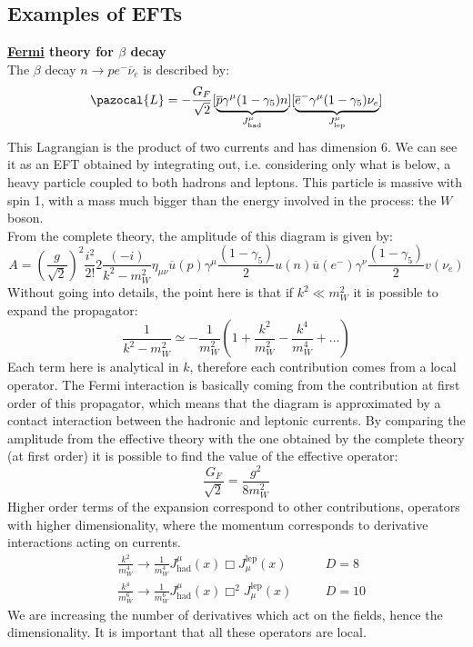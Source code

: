 \documentclass[../main.tex]{subfiles}
\begin{document}
\subsection{Examples of EFTs}
\begin{example}\textbf{\href{https://en.wikipedia.org/wiki/Enrico_Fermi}{Fermi} theory for $\beta$ decay}\\
The $\beta$ decay $n\to pe^-\overline{\nu}_e$ is described by:
\[
\pazocal{L}=-\frac{G_F}{\sqrt{2}}[\underbrace{\overline{p}\gamma^\mu(1-\gamma_5)n}_{J^{\mu}_{\text{had}}}][\underbrace{\overline{e}^-\gamma^\mu(1-\gamma_5)\nu_e}_{J^{\mu}_{\text{lep}}}]
\]
This Lagrangian is the product of two currents and has dimension 6. We can see it as an EFT obtained by integrating out, i.e. considering only what is below, a heavy particle coupled to both hadrons and leptons. This particle is massive with spin 1, with a mass much bigger than the energy involved in the process: the $W$ boson.\\
From the complete theory, the amplitude of this diagram is given by:
\[
A=\left(\frac{g}{\sqrt{2}}\right)^2\frac{i^2}{2!}2\frac{(-i)}{k^2-m_W^2}\eta_{\mu\nu}\overline{u}(p)\gamma^\mu\frac{(1-\gamma_5)}{2}u(n)\overline{u}(e^-)\gamma^\nu\frac{(1-\gamma_5)}{2}v(\nu_e)
\]
Without going into details, the point here is that if $k^2\ll m_W^2$ it is possible to expand the propagator:
\[
\frac{1}{k^2-m_W^2}\simeq-\frac{1}{m_W^2}\left(1+\frac{k^2}{m_W^2}-\frac{k^4}{m_W^4}+\dots\right)
\]
Each term here is analytical in $k$, therefore each contribution comes from a local operator. The Fermi interaction is basically coming from the contribution at first order of this propagator, which means that the diagram is approximated by a contact interaction between the hadronic and leptonic currents. By comparing the amplitude from the effective theory with the one obtained by the complete theory (at first order) it is possible to find the value of the effective operator:
\[
\frac{G_F}{\sqrt{2}}=\frac{g^2}{8m_W^2}
\]
Higher order terms of the expansion correspond to other contributions, operators with higher dimensionality, where the momentum corresponds to derivative interactions acting on currents.
\[
\begin{aligned}
&\frac{k^2}{m_W^4}\to\frac{1}{m_W^4}J_{\text{had}}^\mu(x)\Box J_\mu^{\text{lep}}(x) \quad &&D=8\\
&\frac{k^4}{m_W^6}\to\frac{1}{m_W^6}J_{\text{had}}^\mu(x)\Box^2 J_\mu^{\text{lep}}(x) \quad &&D=10
\end{aligned}
\]
We are increasing the number of derivatives which act on the fields, hence the dimensionality. It is important that all these operators are local.
\end{example}
\end{document}
